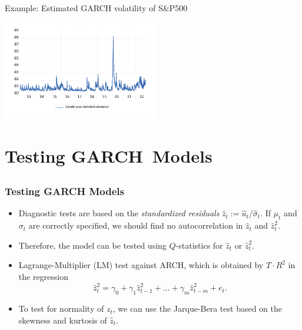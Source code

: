 \begin{frame}%

\begin{block}{Example: Estimated GARCH volatility of S\&P500}
\centerline{\includegraphics[height=1.7in]{sp500_sigmas}}
\end{block}

\end{frame}%

\section[Testing]{Testing GARCH\ Models}\subsection*{}
\begin{frame}%

\frametitle{Testing GARCH Models}

\begin{itemize}
\item Diagnostic tests are based on the \emph{\color{red}standardized
residuals} $\hat{z}_{t}:=\hat{u}_{t}/\hat{\sigma}_{t}$. If $\mu _{t}$ and $%
\sigma _{t}$ are correctly specified, we should find no autocorrelation in $%
\hat{z}_{t}$ and $\hat{z}_{t}^{2}$.

\item Therefore, the model can be tested using $Q$-statistics for $\hat{z}%
_{t}$ or $\hat{z}_{t}^{2}$.

\item Lagrange-Multiplier (LM) test against ARCH, which is obtained by $%
T\cdot R^{2}$ in the regression%
\begin{equation*}
\hat{z}_{t}^{2}=\gamma _{0}+\gamma _{1}\hat{z}_{t-1}^{2}+\ldots +\gamma _{m}%
\hat{z}_{t-m}^{2}+e_{t}.
\end{equation*}

\item To test for normality of $z_{t}$, we can use the Jarque-Bera test
based on the skewness and kurtosis of $\hat{z}_{t}$.
\end{itemize}

\end{frame}%

